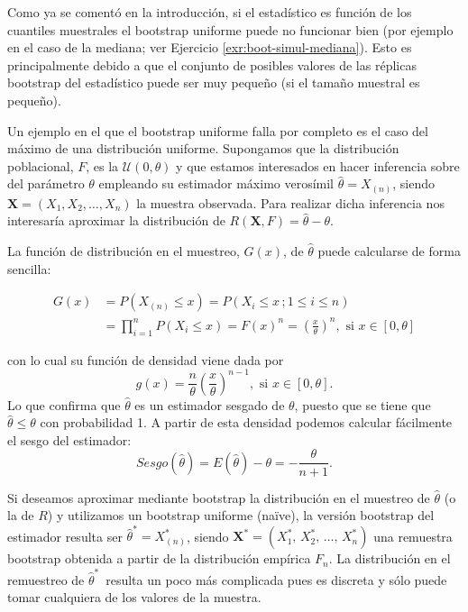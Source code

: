 \documentclass[
  10pt,
]{book}
\renewcommand{\mathbf}[1]{\symbf{#1}}
\theoremstyle{break}
\theoremstyle{nonumberplain}
\begin{document}
Como ya se comentó en la introducción, si el estadístico es función de los cuantiles muestrales el bootstrap uniforme puede no funcionar bien (por ejemplo en el caso de la mediana; ver Ejercicio \ref{exr:boot-simul-mediana}).
Esto es principalmente debido a que el conjunto de posibles valores de las réplicas bootstrap del estadístico puede ser muy pequeño (si el tamaño muestral es pequeño).

Un ejemplo en el que el bootstrap uniforme falla por completo es el caso del máximo de una distribución uniforme.
Supongamos que la distribución poblacional, \(F\), es la \(\mathcal{U}\left( 0,\theta \right)\) y que estamos interesados en hacer inferencia sobre del parámetro \(\theta\) empleando su estimador máximo verosímil \(\hat{\theta}=X_{(n)}\), siendo \(\mathbf{X}=\left( X_1,X_2,\ldots ,X_n \right)\) la muestra observada.
Para realizar dicha inferencia nos interesaría aproximar la distribución de
\(R\left( \mathbf{X},F \right) =\hat{\theta}-\theta\).

La función de distribución en el muestreo, \(G\left( x \right)\), de
\(\hat{\theta}\) puede calcularse de forma sencilla:

\[\begin{aligned}
G\left( x \right) &= P\left( X_{\left(
n \right)}\leq x \right) =P\left( X_i\leq x\,;
 1 \leq i \leq n \right) \\
&= \prod_{i=1}^{n}P\left( X_i\leq x \right) =F\left( x \right)^{n}=\left( 
\frac{x}{\theta } \right)^{n},\text{ si }x\in \left[ 0,\theta \right]\end{aligned}\]

con lo cual su función de densidad viene dada por
\[g\left( x \right) =\frac{n}{\theta }\left( \frac{x}{\theta } \right)^{n-1},
\text{ si }x\in \left[ 0,\theta \right] .\]
Lo que confirma que \(\hat{\theta}\) es un estimador sesgado de \(\theta\), puesto que se tiene que \(\hat{\theta}\leq \theta\) con probabilidad 1.
A partir de esta densidad podemos calcular fácilmente el sesgo del estimador:
\[Sesgo\left( \hat{\theta} \right) =E\left( \hat{\theta} \right) -\theta = -\frac{\theta }{n+1}.\]

Si deseamos aproximar mediante bootstrap la distribución en el muestreo de \(\hat{\theta}\) (o la de \(R\)) y utilizamos un bootstrap uniforme (naïve), la versión bootstrap del estimador resulta ser \(\hat{\theta}^{\ast}=X_{(n)}^{\ast}\),
siendo \(\mathbf{X}^{\ast}=\left(X_1^{\ast}\text{, }X_2^{\ast}\text{, }\ldots \text{, }X_n^{\ast} \right)\) una remuestra bootstrap obtenida a partir de la distribución empírica \(F_n\).
La distribución en el remuestreo de \(\hat{\theta} ^{\ast}\,\) resulta un poco más complicada pues es discreta y sólo puede
tomar cualquiera de los valores de la muestra.
\end{document}
